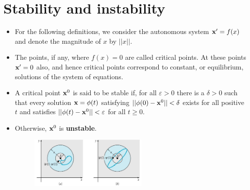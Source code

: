 \documentclass[11pt,a4paper]{article}
\begin{document}
	\section*{Stability and instability}
	\begin{itemize}
		\item For the following definitions, we consider the autonomous system $\vb{x}^\prime = f(x)$ and denote the magnitude of $x$ by $||x||$.
		\item The points, if any, where $f(x) = 0$ are called critical points. At these points $\vb{x}^\prime = 0$ also, and hence critical points correspond to constant, or equilibrium, solutions of the system of equations.
		\item A critical point $\vb{x}^0$ is said to be stable if, for all $\varepsilon > 0$ there is a $\delta > 0$ such that every solution $\vb{x} = \phi(t)$ satisfying $||\phi(0) - \vb{x}^0|| < \delta$ exists for all positive $t$ and satisfies $||\phi(t) - \vb{x}^0|| < \varepsilon$ for all $t \geq 0$.
		\item Otherwise, $\vb{x}^0$ is \textbf{unstable}.
		\begin{figure}[H]
			\centering
				\includegraphics[width=0.55\textwidth]{figure/Lec16f1.PNG}
		\end{figure}
	\end{itemize}
\end{document}

